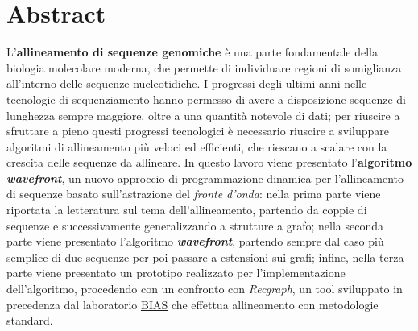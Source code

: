 \chapter{Abstract}
L'\textbf{allineamento di sequenze genomiche} è una parte fondamentale della biologia molecolare moderna, che permette di individuare regioni di somiglianza all'interno delle sequenze nucleotidiche. I progressi degli ultimi anni nelle tecnologie di sequenziamento hanno permesso di avere a disposizione sequenze di lunghezza sempre maggiore, oltre a una quantità notevole di dati; per riuscire a sfruttare a pieno questi progressi tecnologici è necessario riuscire a sviluppare algoritmi di allineamento più veloci ed efficienti, che riescano a scalare con la crescita delle sequenze da allineare. In questo lavoro viene presentato l'\textbf{algoritmo \textit{wavefront}}, un nuovo approccio di programmazione dinamica per l'allineamento di sequenze basato sull'astrazione del \emph{fronte d'onda}: nella prima parte viene riportata la letteratura sul tema dell'allineamento, partendo da coppie di sequenze e successivamente generalizzando a strutture a grafo; nella seconda parte viene presentato l'algoritmo \textbf{\textit{wavefront}}, partendo sempre dal caso più semplice di due sequenze per poi passare a estensioni sui grafi; infine, nella terza parte viene presentato un prototipo realizzato per l'implementazione dell'algoritmo, procedendo con un confronto con \emph{Recgraph}, un tool sviluppato in precedenza dal laboratorio \href{https://algolab.eu/}{BIAS} che effettua allineamento con metodologie standard.